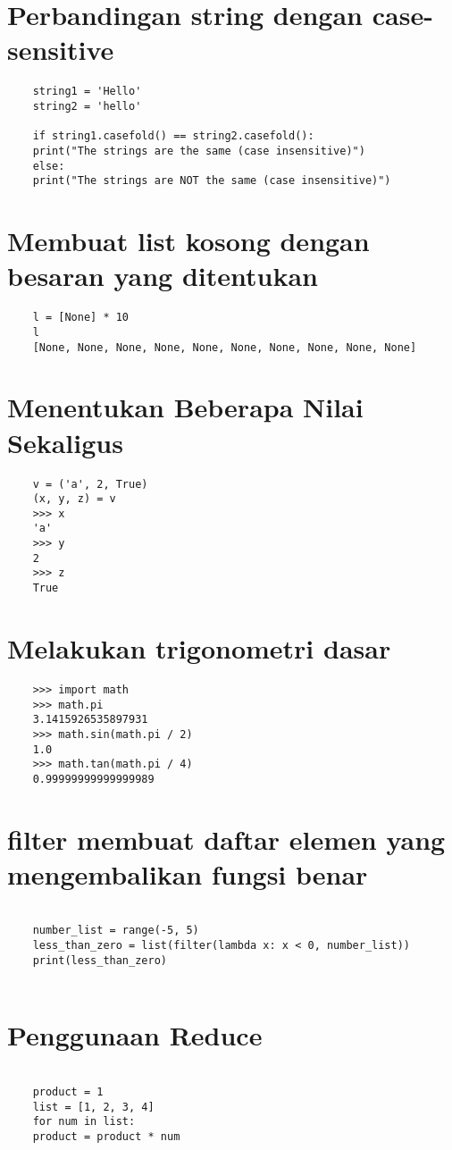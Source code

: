 \documentclass[12pt]{article} %
\begin{document}
\section {Perbandingan string dengan case-sensitive}
\begin{lstlisting}
	string1 = 'Hello'
	string2 = 'hello'
	
	if string1.casefold() == string2.casefold():
	print("The strings are the same (case insensitive)")
	else:
	print("The strings are NOT the same (case insensitive)")
\end{lstlisting}

\section {Membuat list kosong dengan besaran yang ditentukan}
\begin{lstlisting}
	l = [None] * 10
	l
	[None, None, None, None, None, None, None, None, None, None]
\end{lstlisting}

\section {Menentukan Beberapa Nilai Sekaligus}
\begin{lstlisting}
	v = ('a', 2, True)
	(x, y, z) = v 
	>>> x
	'a'
	>>> y
	2
	>>> z
	True
\end{lstlisting}

\section {Melakukan trigonometri dasar}
\begin{lstlisting}
	>>> import math
	>>> math.pi 
	3.1415926535897931
	>>> math.sin(math.pi / 2) 
	1.0
	>>> math.tan(math.pi / 4) 
	0.99999999999999989
\end{lstlisting}

\section {filter membuat daftar elemen yang mengembalikan fungsi
benar}
\begin{lstlisting}

	number_list = range(-5, 5)
	less_than_zero = list(filter(lambda x: x < 0, number_list))
	print(less_than_zero)
	
	\end{lstlisting}
	
	\section {Penggunaan Reduce }
	\begin{lstlisting}
	
	product = 1
	list = [1, 2, 3, 4]
	for num in list:
	product = product * num
\end{lstlisting}
\end{document}
